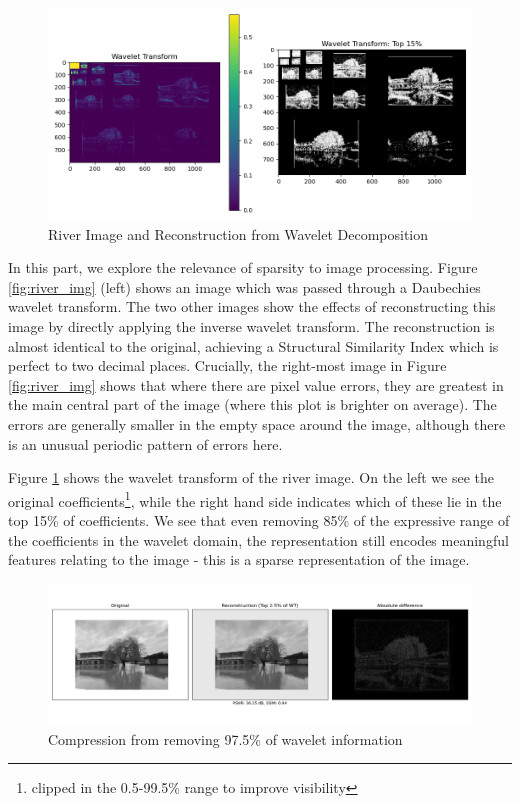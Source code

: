 \documentclass[12pt]{article}
\begin{document}
\begin{figure}[htp]
    \includegraphics[scale=0.5, center]{figures/wavelet_transform.png}
    \caption{River Image and Reconstruction from Wavelet Decomposition}
    \label{fig:wavelet_transform}
\end{figure}

In this part, we explore the relevance of sparsity to image processing.
Figure \ref{fig:river_img} (left) shows an image which was passed through a Daubechies wavelet transform.
The two other images show the effects of reconstructing this image by directly applying the inverse wavelet transform.
The reconstruction is almost identical to the original, achieving a Structural Similarity Index which is perfect to two decimal places.
Crucially, the right-most image in Figure \ref{fig:river_img} shows that where there are pixel value errors,
they are greatest in the main central part of the image (where this plot is brighter on average).
The errors are generally smaller in the empty space around the image, although there is an unusual periodic pattern of errors here.

Figure \ref{fig:wavelet_transform} shows the wavelet transform of the river image.
On the left we see the original coefficients\footnote{clipped in the 0.5-99.5\% range to improve visibility},
while the right hand side indicates which of these lie in the top 15\% of coefficients.
We see that even removing 85\% of the expressive range of the coefficients in the wavelet domain,
the representation still encodes meaningful features relating to the image - this is a sparse representation of the image.

\begin{figure}[htp]
    \includegraphics[scale=0.45, center]{figures/river_img_compressed_0.025.png}
    \caption{Compression from removing 97.5\% of wavelet information}
    \label{fig:river_3pct}
\end{figure}
\end{document}
